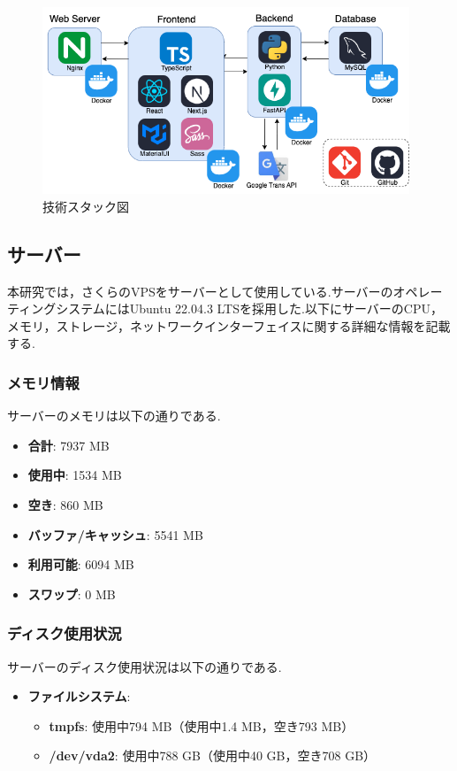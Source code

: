 \documentclass[b5paper,12pt,dvipdfmx]{jsreport}
\begin{document}
\begin{figure}[H]
	\centering
    \includegraphics[width=110mm,height=55.87mm]{./img/system/.png}
	\caption{技術スタック図}
	\label{fig:tech_stack}
\end{figure}


\subsection{サーバー}
本研究では，さくらのVPSをサーバーとして使用している.サーバーのオペレーティングシステムにはUbuntu 22.04.3 LTSを採用した.以下にサーバーのCPU，メモリ，ストレージ，ネットワークインターフェイスに関する詳細な情報を記載する.


\subsubsection{メモリ情報}
サーバーのメモリは以下の通りである.
\begin{itemize}
    \item \textbf{合計}: 7937 MB
    \item \textbf{使用中}: 1534 MB
    \item \textbf{空き}: 860 MB
    \item \textbf{バッファ/キャッシュ}: 5541 MB
    \item \textbf{利用可能}: 6094 MB
    \item \textbf{スワップ}: 0 MB
\end{itemize}


\subsubsection{ディスク使用状況}
サーバーのディスク使用状況は以下の通りである.
\begin{itemize}
    \item \textbf{ファイルシステム}:
    \begin{itemize}
        \item \textbf{tmpfs}: 使用中794 MB（使用中1.4 MB，空き793 MB）
        \item \textbf{/dev/vda2}: 使用中788 GB（使用中40 GB，空き708 GB）
    \end{itemize}
\end{itemize}
\end{document}
